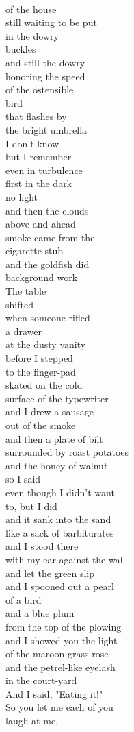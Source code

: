 \documentclass[smalldemyvopaper,11pt,twoside,onecolumn,openright,extrafontsizes]{memoir}
\begin{document}
\\of the house
\\still waiting to be put
\\in the dowry
\\buckles
\\and still the dowry
\\honoring the speed
\\of the ostensible
\\bird
\\that flashes by
\\the bright umbrella
\\I don't know
\\but I remember
\\even in turbulence
\\first in the dark
\\no light
\\and then the clouds
\\above and ahead
\\smoke came from the
\\cigarette stub
\\and the goldfish did
\\background work
\\The table
\\shifted
\\when someone rifled
\\a drawer
\\at the dusty vanity
\\before I stepped
\\to the finger-pad
\\skated on the cold
\\surface of the typewriter
\\and I drew a sausage
\\out of the smoke
\\and then a plate of bilt
\\surrounded by roast potatoes
\\and the honey of walnut
\\so I said
\\even though I didn't want
\\to, but I did
\\and it sank into the sand
\\like a sack of barbiturates
\\and I stood there
\\with my ear against the wall
\\and let the green slip
\\and I spooned out a pearl
\\of a bird
\\and a blue plum
\\from the top of the plowing
\\and I showed you the light
\\of the maroon grass rose
\\and the petrel-like eyelash
\\in the court-yard
\\And I said, "Eating it!"
\\So you let me each of you
\\laugh at me.
\end{document}
